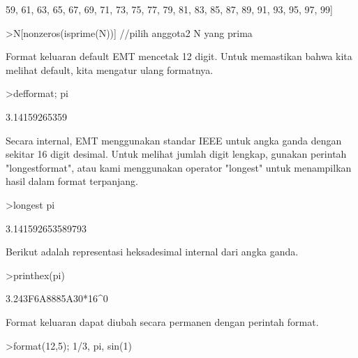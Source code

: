 \documentclass[a4paper,10pt]{article}
\begin{document}
\begin{eulernotebook}
\begin{eulercomment}
\begin{eulercomment}
\begin{euleroutput}
  59,  61,  63,  65,  67,  69,  71,  73,  75,  77,  79,  81,  83,  85,
  87,  89,  91,  93,  95,  97,  99]
\end{euleroutput}
\begin{eulerprompt}
>N[nonzeros(isprime(N))] //pilih anggota2 N yang prima
\end{eulerprompt}
\begin{euleroutput}
  [2,  3,  5,  7,  11,  13,  17,  19,  23,  29,  31,  37,  41,  43,  47,
  53,  59,  61,  67,  71,  73,  79,  83,  89,  97]
\end{euleroutput}
\begin{eulercomment}
Format keluaran default EMT mencetak 12 digit. Untuk memastikan bahwa
kita melihat default, kita mengatur ulang formatnya.
\end{eulercomment}
\begin{eulerprompt}
>defformat; pi
\end{eulerprompt}
\begin{euleroutput}
  3.14159265359
\end{euleroutput}
\begin{eulercomment}
Secara internal, EMT menggunakan standar IEEE untuk angka ganda dengan
sekitar 16 digit desimal. Untuk melihat jumlah digit lengkap, gunakan
perintah "longestformat", atau kami menggunakan operator "longest"
untuk menampilkan hasil dalam format terpanjang.
\end{eulercomment}
\begin{eulerprompt}
>longest pi
\end{eulerprompt}
\begin{euleroutput}
        3.141592653589793 
\end{euleroutput}
\begin{eulercomment}
Berikut adalah representasi heksadesimal internal dari angka ganda.
\end{eulercomment}
\begin{eulerprompt}
>printhex(pi)
\end{eulerprompt}
\begin{euleroutput}
  3.243F6A8885A30*16^0
\end{euleroutput}
\begin{eulercomment}
Format keluaran dapat diubah secara permanen dengan perintah format.
\end{eulercomment}
\begin{eulerprompt}
>format(12,5); 1/3, pi, sin(1)
\end{eulerprompt}
\begin{euleroutput}

\end{euleroutput}
\end{eulercomment}
\end{eulercomment}
\end{eulernotebook}
\end{document}
